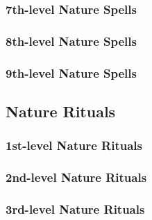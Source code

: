 \subsubsection{7th-level Nature Spells}
\begin{spelllist}
    \SLantilifeshell
    \SLavatarofwind
    \SLgolemheart
    \SLicestorm
    \SLimmolation
\end{spelllist}

\subsubsection{8th-level Nature Spells}
\begin{spelllist}
    \SLavatarofmight
    \SLfirestorm
\end{spelllist}

\subsubsection{9th-level Nature Spells}
\begin{spelllist}
    \SLearthquake
    \SLstormofvengeance
\end{spelllist}

\subsection{Nature Rituals}\label{Nature Rituals}

\subsubsection{1st-level Nature Rituals}
\begin{rituallist}
    \SLcreatewater
    \SLendureelements
    \SLlight
    \SLmending
    \SLpurifysustenance
    \SLreadmagic
\end{rituallist}

\subsubsection{2nd-level Nature Rituals}
\begin{rituallist}
    \SLanimalmessenger
    \SLcomprehendlanguages
    \SLcreatesustenance
    \SLenhancearmor
    \SLenhanceweapon
    \SLfindtraps
    \SLgentlerepose
    \SLpasswithouttrace
    \SLshaping
\end{rituallist}

\subsubsection{3rd-level Nature Rituals}
\begin{rituallist}
    \SLcontagion
    \SLfiretrap
    \SLironwood
    \SLitemattunement
    \SLrestoresenses
    \SLremovedisease
    \SLwaterbreathing
\end{rituallist}

